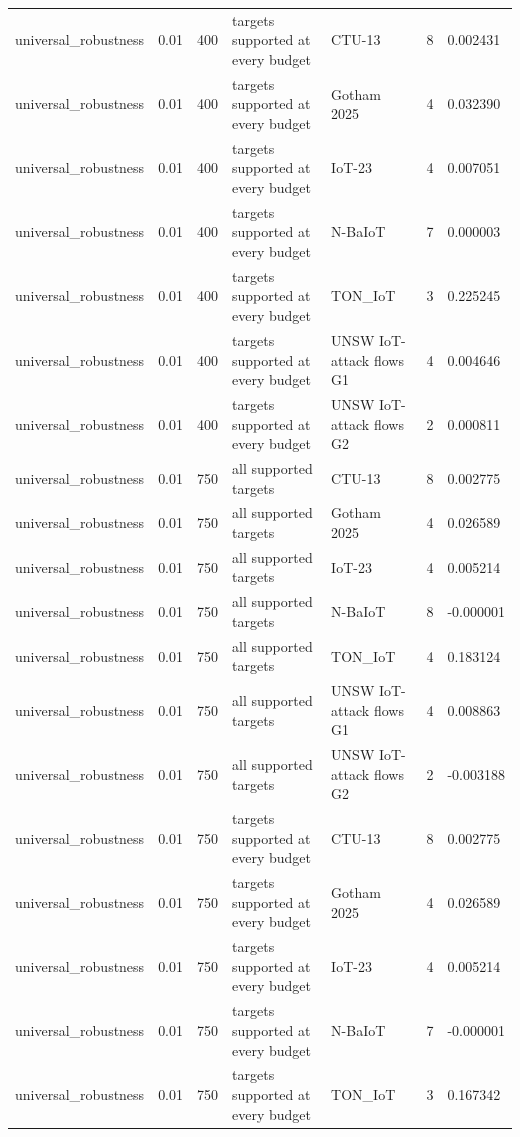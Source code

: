 \begin{tabular}{lllllll}
universal\_robustness & 0.01 & 400 & targets supported at every budget & CTU-13 & 8 & 0.002431 \\
universal\_robustness & 0.01 & 400 & targets supported at every budget & Gotham 2025 & 4 & 0.032390 \\
universal\_robustness & 0.01 & 400 & targets supported at every budget & IoT-23 & 4 & 0.007051 \\
universal\_robustness & 0.01 & 400 & targets supported at every budget & N-BaIoT & 7 & 0.000003 \\
universal\_robustness & 0.01 & 400 & targets supported at every budget & TON\_IoT & 3 & 0.225245 \\
universal\_robustness & 0.01 & 400 & targets supported at every budget & UNSW IoT-attack flows G1 & 4 & 0.004646 \\
universal\_robustness & 0.01 & 400 & targets supported at every budget & UNSW IoT-attack flows G2 & 2 & 0.000811 \\
universal\_robustness & 0.01 & 750 & all supported targets & CTU-13 & 8 & 0.002775 \\
universal\_robustness & 0.01 & 750 & all supported targets & Gotham 2025 & 4 & 0.026589 \\
universal\_robustness & 0.01 & 750 & all supported targets & IoT-23 & 4 & 0.005214 \\
universal\_robustness & 0.01 & 750 & all supported targets & N-BaIoT & 8 & -0.000001 \\
universal\_robustness & 0.01 & 750 & all supported targets & TON\_IoT & 4 & 0.183124 \\
universal\_robustness & 0.01 & 750 & all supported targets & UNSW IoT-attack flows G1 & 4 & 0.008863 \\
universal\_robustness & 0.01 & 750 & all supported targets & UNSW IoT-attack flows G2 & 2 & -0.003188 \\
universal\_robustness & 0.01 & 750 & targets supported at every budget & CTU-13 & 8 & 0.002775 \\
universal\_robustness & 0.01 & 750 & targets supported at every budget & Gotham 2025 & 4 & 0.026589 \\
universal\_robustness & 0.01 & 750 & targets supported at every budget & IoT-23 & 4 & 0.005214 \\
universal\_robustness & 0.01 & 750 & targets supported at every budget & N-BaIoT & 7 & -0.000001 \\
universal\_robustness & 0.01 & 750 & targets supported at every budget & TON\_IoT & 3 & 0.167342 \\

\end{tabular}
